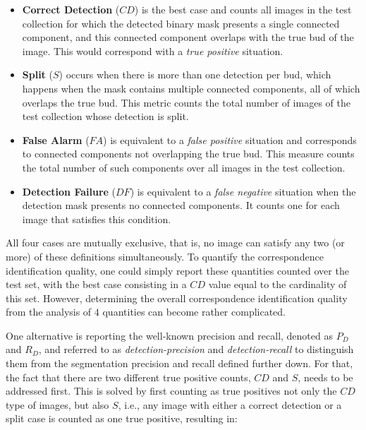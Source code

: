 \documentclass[a4paper,authoryear,review]{elsarticle}
\begin{document}
\begin{itemize}
\item \textbf{Correct Detection} ($CD$) is the best case and counts all images in the test collection for which the detected binary mask presents a single connected component, and this connected component overlaps with the true bud of the image. This would correspond with a \emph{true positive} situation.

\item \textbf{Split} ($S$) occurs when there is more than one detection per bud, which happens  when the mask contains multiple connected components, all of which overlaps the true bud. This metric counts the total number of images of the test collection whose detection is split.

\item \textbf{False Alarm} ($FA$) is equivalent to a \emph{false positive} situation and corresponds to connected components not overlapping the true bud. This measure counts the total number of such components over all images in the test collection.

\item \textbf{Detection Failure} ($DF$) is equivalent to a \emph{false negative} situation when the detection mask presents no connected components. It counts one for each image that satisfies this condition.
\end{itemize}

All four cases are mutually exclusive, that is, no image can satisfy any two (or more) of these definitions simultaneously. To quantify the correspondence identification quality, one could simply report these quantities counted over the test set, with the best case consisting in a $CD$ value equal to the cardinality of this set. However, determining the overall correspondence identification quality from the analysis of $4$ quantities can become rather complicated. 

One alternative is reporting the well-known precision and recall, denoted as $P_D$ and $R_D$, and referred to as \emph{detection-precision} and \emph{detection-recall} to distinguish them from the segmentation precision and recall defined further down. For that, the fact that there are two different true positive counts, $CD$ and $S$, needs to be addressed first. This is solved by first counting as true positives not only the $CD$ type of images, but also $S$, i.e., any image with either a correct detection or a split case is counted as one true positive, resulting in:
\end{document}
